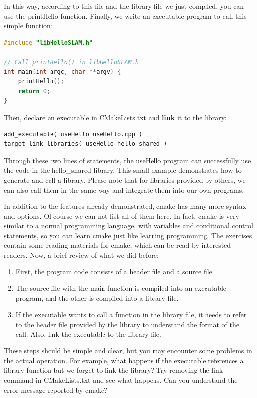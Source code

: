In this way, according to this file and the library file we just compiled, you can use the printHello function. Finally, we write an executable program to call this simple function:

\begin{lstlisting}[language=c++,caption=slambook2/ch2/useHello.cpp]
#include "libHelloSLAM.h"

// Call printHello() in libHelloSLAM.h
int main(int argc, char **argv) {
    printHello();
    return 0;
}
\end{lstlisting}

Then, declare an executable in CMakeLists.txt and \textbf{link} it to the library: 
\begin{lstlisting}[caption=slambook2/ch2/CMakeLists.txt]
add_executable( useHello useHello.cpp )
target_link_libraries( useHello hello_shared )
\end{lstlisting}

Through these two lines of statements, the useHello program can successfully use the code in the hello\_shared library. This small example demonstrates how to generate and call a library. Please note that for libraries provided by others, we can also call them in the same way and integrate them into our own programs.

In addition to the features already demonstrated, cmake has many more syntax and options. Of course we can not list all of them here. In fact, cmake is very similar to a normal programming language, with variables and conditional control statements, so you can learn cmake just like learning programming. The exercises contain some reading materials for cmake, which can be read by interested readers. Now, a brief review of what we did before:

\begin{enumerate}
    \item First, the program code consists of a header file and a source file.
    \item The source file with the main function is compiled into an executable program, and the other is compiled into a library file.
    \item If the executable wants to call a function in the library file, it needs to refer to the header file provided by the library to understand the format of the call. Also, link the executable to the library file.
\end{enumerate}

These steps should be simple and clear, but you may encounter some problems in the actual operation. For example, what happens if the executable references a library function but we forget to link the library? Try removing the link command in CMakeLists.txt and see what happens. Can you understand the error message reported by cmake?

